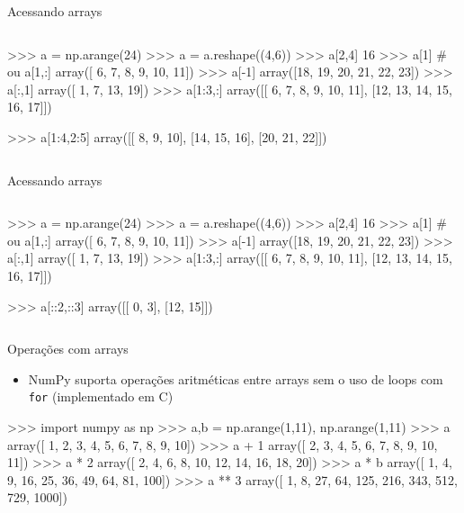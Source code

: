 \documentclass[12pt,t,graphics]{beamer}
\begin{document}
\begin{frame}[t,fragile]{Acessando arrays}
	\vspace{-0.5cm}
	\begin{columns}
		\begin{python}
>>> a = np.arange(24)
>>> a = a.reshape((4,6))
>>> a[2,4]
16
>>> a[1]  # ou a[1,:]
array([ 6,  7,  8,  9, 10, 11])
>>> a[-1]
array([18, 19, 20, 21, 22, 23])
>>> a[:,1]
array([ 1,  7, 13, 19])
>>> a[1:3,:]
array([[ 6,  7,  8,  9, 10, 11],
	[12, 13, 14, 15, 16, 17]])
		
>>> a[1:4,2:5]
array([[ 8,  9, 10],
	   [14, 15, 16],
	   [20, 21, 22]])
		\end{python}
	\end{columns}
\end{frame}

\begin{frame}[t,fragile]{Acessando arrays}
	\vspace{-0.5cm}
	\begin{columns}
		\column{.5\textwidth}
		\begin{python}
		>>> a = np.arange(24)
		>>> a = a.reshape((4,6))
		>>> a[2,4]
		16
		>>> a[1]  # ou a[1,:]
		array([ 6,  7,  8,  9, 10, 11])
		>>> a[-1]
		array([18, 19, 20, 21, 22, 23])
		>>> a[:,1]
		array([ 1,  7, 13, 19])
		>>> a[1:3,:]
		array([[ 6,  7,  8,  9, 10, 11],
		[12, 13, 14, 15, 16, 17]])
		
		>>> a[::2,::3]
		array([[ 0,  3],
		[12, 15]])
		\end{python}
	\end{columns}
\end{frame}

\begin{frame}[t,fragile]{Operações com arrays}
	\begin{itemize}
		\item NumPy suporta operações aritméticas entre arrays sem o uso de loops
		com \texttt{for} (implementado em C)
	\end{itemize}
	\begin{python}
	>>> import numpy as np
	>>> a,b = np.arange(1,11), np.arange(1,11)
	>>> a
	array([ 1, 2, 3, 4, 5, 6, 7, 8, 9, 10])
	>>> a + 1
	array([ 2, 3, 4, 5, 6, 7, 8, 9, 10, 11])
	>>> a * 2
	array([ 2, 4, 6, 8, 10, 12, 14, 16, 18, 20])
	>>> a * b
	array([ 1, 4, 9, 16, 25, 36, 49, 64, 81, 100])
	>>> a ** 3
	array([ 1, 8, 27, 64, 125, 216, 343, 512, 729, 1000])
	\end{python}
\end{frame}
\end{document}
